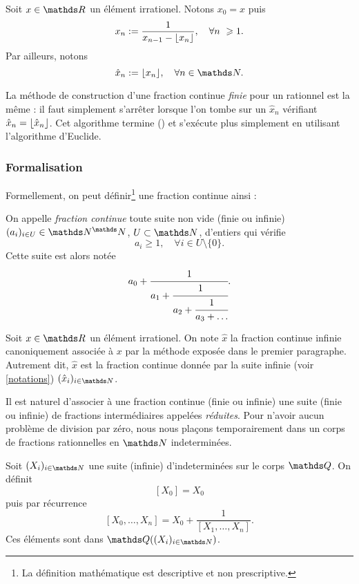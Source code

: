 \begin{notation}\label{notations}
	Soit $x\in \R$ un élément irrationel. Notons $x_0 = x$ puis \[x_n :=
	\frac{1}{x_{n-1} - \ent{x_n}}, \quad \forall n \geq 1.\] Par ailleurs,
	notons \[\hat{x}_n := \ent{x_n}, \quad \forall n\in \N.\]
\end{notation}

\begin{remarque}
	La méthode de construction d'une fraction continue \emph{finie} pour un
	rationnel est la même : il faut simplement s'arrêter lorsque l'on tombe sur
	un $\hat{x}_n$ vérifiant $\hat{x}_n = \lfloor\hat{x}_n\rfloor$. Cet algorithme
	termine () et s'exécute plus simplement en utilisant l'algorithme
	d'Euclide.
\end{remarque}

\subsubsection{Formalisation}

Formellement, on peut définir\footnote{La définition mathématique est
descriptive et non prescriptive.} une fraction continue ainsi :

\begin{definition}\label{def-fracont}
	On appelle \emph{fraction continue} toute suite non vide (finie ou infinie)
	$(a_i)_{i\in U} \in \N^\N$, $U\subset \N$, d'entiers qui vérifie \[a_i
	\geq 1, \quad \forall i\in U\setminus\{0\}.\] Cette suite est alors notée
	\[a_0 + \cfrac{1}{a_1 + \cfrac{1}{a_2 + \cfrac{1}{a_3 + \dots}}}.\]
\end{definition}

\begin{notation}
	Soit $x\in \R$ un élément irrationel. On note $\hat{x}$ la fraction
	continue infinie canoniquement associée à $x$ par la méthode exposée dans
	le premier paragraphe. Autrement dit, $\hat{x}$ est la fraction continue
	donnée par la suite infinie (voir \ref{notations}) $(\hat{x}_i)_{i\in
	\N}$.
\end{notation}

Il est naturel d'associer à une fraction continue (finie ou infinie) une suite
(finie ou infinie) de fractions \og intermédiaires \fg{} appelées
\emph{réduites}. Pour n'avoir aucun problème de division par zéro, nous nous
plaçons temporairement dans un corps de fractions rationnelles en $\N$
indeterminées.

\begin{definition}
	Soit $(X_i)_{i\in \N}$ une suite (infinie) d'indeterminées sur le corps
	$\Q$. On définit \[[X_0] = X_0\] puis par récurrence \[[X_0, \dots,
	X_n] = X_0 + \frac{1}{[X_1, \dots, X_n]}.\] Ces éléments sont dans
	$\Q((X_i)_{i\in \N})$.
\end{definition}

